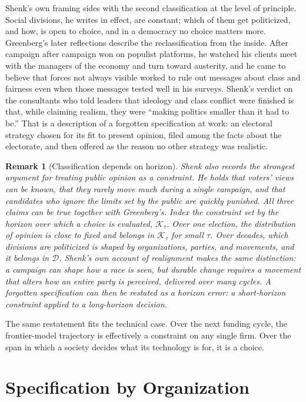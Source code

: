 \documentclass[11pt]{article}
\newtheorem{remark}{Remark}
\begin{document}
Shenk's own framing sides with the second classification at the level of principle. Social divisions, he writes in effect, are constant; which of them get politicized, and how, is open to choice, and in a democracy no choice matters more. Greenberg's later reflections describe the reclassification from the inside. After campaign after campaign won on populist platforms, he watched his clients meet with the managers of the economy and turn toward austerity, and he came to believe that forces not always visible worked to rule out messages about class and fairness even when those messages tested well in his surveys. Shenk's verdict on the consultants who told leaders that ideology and class conflict were finished is that, while claiming realism, they were ``making politics smaller than it had to be.'' That is a description of a forgotten specification at work: an electoral strategy chosen for its fit to present opinion, filed among the facts about the electorate, and then offered as the reason no other strategy was realistic.

\begin{remark}[Classification depends on horizon]
Shenk also records the strongest argument for treating public opinion as a constraint. He holds that voters' views can be known, that they rarely move much during a single campaign, and that candidates who ignore the limits set by the public are quickly punished. All three claims can be true together with Greenberg's. Index the constraint set by the horizon over which a choice is evaluated, $\mathcal{K}_{\tau}$. Over one election, the distribution of opinion is close to fixed and belongs in $\mathcal{K}_{\tau}$ for small $\tau$. Over decades, which divisions are politicized is shaped by organizations, parties, and movements, and it belongs in $\mathcal{D}$. Shenk's own account of realignment makes the same distinction: a campaign can shape how a race is seen, but durable change requires a movement that alters how an entire party is perceived, delivered over many cycles. A forgotten specification can then be restated as a horizon error: a short-horizon constraint applied to a long-horizon decision.
\end{remark}

The same restatement fits the technical case. Over the next funding cycle, the frontier-model trajectory is effectively a constraint on any single firm. Over the span in which a society decides what its technology is for, it is a choice.

\section{Specification by Organization}
\end{document}
